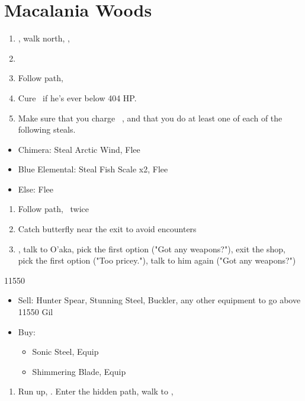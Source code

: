 \chapter{Macalania Woods}

\begin{enumerate}
	\item \sd, walk north, \sd, \save
	\item \formation{\tidus}{\rikku}{\auron}
	\item Follow path, 
	\item Cure \tidus\ if he's ever below 404 HP.
	\item Make sure that you charge \rikku\ \od, and that you do at least one of each of the following steals.
\end{enumerate}
\begin{encounters}
	\begin{itemize}
		\item Chimera: Steal Arctic Wind, Flee
		\item Blue Elemental: Steal Fish Scale x2, Flee
		\item Else: Flee
	\end{itemize}
\end{encounters}
\begin{enumerate}[resume]
	\item Follow path, \sd\ twice
	\item Catch butterfly near the exit to avoid encounters
	\formation{\tidus}{\yuna}{\kimahri}
	\item \save, talk to O'aka, pick the first option ("Got any weapons?"), exit the shop, pick the first option ("Too pricey."), talk to him again ("Got any weapons?")
\end{enumerate}
\begin{shop}{11550}
	\begin{itemize}
		\item Sell: Hunter Spear, Stunning Steel, Buckler, any other equipment to go above 11550 Gil
		\item Buy:
			\begin{itemize}
				\item Sonic Steel, Equip
				\item Shimmering Blade, Equip
			\end{itemize}
	\end{itemize}
\end{shop}
\begin{enumerate}[resume]
	\item Run up, \sd. Enter the hidden path, walk to \auron, \sd
\end{enumerate}
